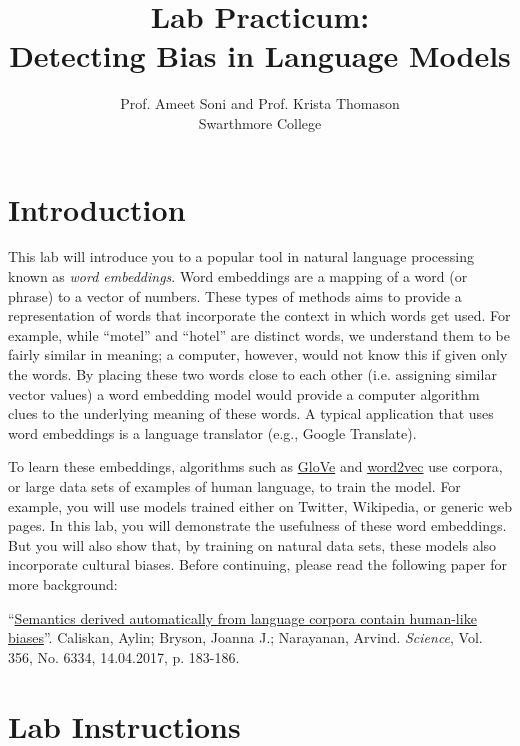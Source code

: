 \documentclass[11pt, letterpaper]{article}
\title{Lab Practicum:\\Detecting Bias in Language Models}
\author{Prof. Ameet Soni and Prof. Krista Thomason\\Swarthmore College}
\date{}
\begin{document}
\maketitle

\section*{Introduction}

This lab will introduce you to a popular tool in natural language processing known as {\it word embeddings}.  Word embeddings are a mapping of a word (or phrase) to a vector of numbers.  These types of methods aims to provide a representation of words that incorporate the context in which words get used.  For example, while ``motel'' and ``hotel'' are distinct words, we understand them to be fairly similar in meaning; a computer, however, would not know this if given only the words.  By placing these two words close to each other (i.e. assigning similar vector values) a word embedding model would provide a computer algorithm clues to the underlying meaning of these words.   A typical application that uses word embeddings is a language translator (e.g., Google Translate).

To learn these embeddings, algorithms such as \href{https://nlp.stanford.edu/projects/glove/}{GloVe} and \href{https://code.google.com/archive/p/word2vec/}{word2vec} use corpora, or large data sets of examples of human language, to train the model.  For example, you will use models trained either on Twitter, Wikipedia, or generic web pages.  In this lab, you will demonstrate the usefulness of these word embeddings.  But you will also show that, by training on natural data sets, these models also incorporate cultural biases.  Before continuing, please read the following paper for more background:

\vspace{0.15in}

\noindent ``\href{https://science.sciencemag.org/content/356/6334/183.full}{Semantics derived automatically from language corpora contain human-like  biases}''. Caliskan, Aylin; Bryson, Joanna J.; Narayanan, Arvind. {\it Science}, Vol. 356, No. 6334, 14.04.2017, p. 183-186.

\vspace{0.15in}

\section*{Lab Instructions}
\end{document}
